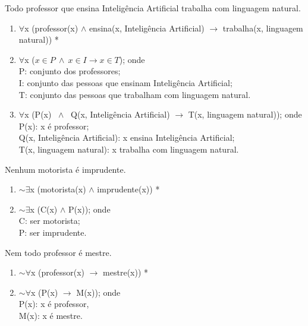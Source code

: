 \bigskip
\begin{exemplo} Todo professor que ensina Inteligência Artificial trabalha com linguagem natural.
\end{exemplo}

\begin{enumerate}[label=(\roman*)]
    \item $\forall$x (professor(x) $\land$ ensina(x, Inteligência Artificial) $\to$ trabalha(x, linguagem natural)) *
    \item $\forall$x ($x \in P\ \land\ x \in I \to x \in T$); onde\\
    P: conjunto dos professores;\\
    I: conjunto das pessoas que ensinam Inteligência Artificial;\\
    T: conjunto das pessoas que trabalham com linguagem natural.
    \item $\forall$x (P(x) $\; \land \;$ Q(x, Inteligência Artificial) $\to$ T(x, linguagem natural)); onde\\
    P(x): x é professor;\\
    Q(x, Inteligência Artificial): x ensina Inteligência Artificial;\\
    T(x, linguagem natural): x trabalha com linguagem natural.
\end{enumerate}

\bigskip
\begin{exemplo} Nenhum motorista é imprudente.
\end{exemplo}

\begin{enumerate}[label=(\roman*)]
    \item $\sim \exists$x (motorista(x) $\land$ imprudente(x)) *
    \item $\sim \exists$x (C(x) $\land$ P(x)); onde\\
    C: ser motorista;\\
    P: ser imprudente.
\end{enumerate}

\bigskip
\begin{exemplo} Nem todo professor é mestre.
\end{exemplo}

\begin{enumerate}[label=(\roman*)]
    \item $\sim \forall$x (professor(x) $\to$ mestre(x)) *
    \item $\sim \forall$x (P(x) $\to$ M(x)); onde\\
    P(x): x é professor,
    \\M(x): x é mestre.
\end{enumerate}

